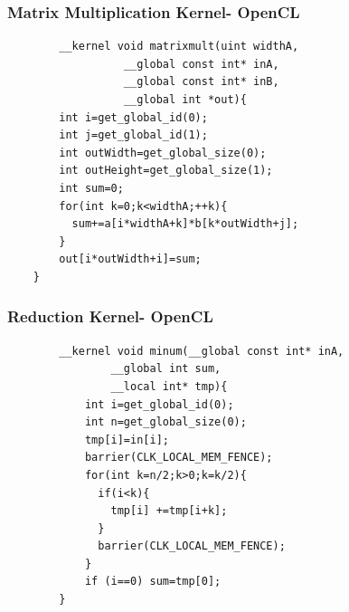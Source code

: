 \documentclass{beamer}
\begin{document}
    \begin{frame}[fragile=singleslide]
    	\frametitle{Matrix Multiplication Kernel- OpenCL}
    	\begin{lstlisting}
    	__kernel void matrixmult(uint widthA,
    	          __global const int* inA,
    	          __global const int* inB,
    	          __global int *out){
    	int i=get_global_id(0);
    	int j=get_global_id(1);
    	int outWidth=get_global_size(0);
    	int outHeight=get_global_size(1);
    	int sum=0;
    	for(int k=0;k<widthA;++k){
    	  sum+=a[i*widthA+k]*b[k*outWidth+j];
    	}
    	out[i*outWidth+i]=sum;
    }
    	\end{lstlisting}
    \end{frame}
    
        \begin{frame}[fragile=singleslide]
        	\frametitle{Reduction Kernel- OpenCL}
        	\begin{lstlisting}
        __kernel void minum(__global const int* inA,
        	    __global int sum,
        	    __local int* tmp){
        	int i=get_global_id(0);
        	int n=get_global_size(0);
        	tmp[i]=in[i];
        	barrier(CLK_LOCAL_MEM_FENCE);
        	for(int k=n/2;k>0;k=k/2){
        	  if(i<k){
        	    tmp[i] +=tmp[i+k];
        	  }
        	  barrier(CLK_LOCAL_MEM_FENCE);
        	}
        	if (i==0) sum=tmp[0];
        }
        	\end{lstlisting}
        \end{frame}
        
\end{document}
